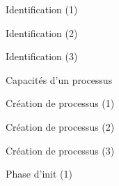 \documentclass[12pt,t]{beamer}
\begin{document}
\begin{frame}{Identification (1)}
\end{frame}

\begin{frame}{Identification (2)}
\end{frame}

\begin{frame}{Identification (3)}
\end{frame}

\begin{frame}{Capacités d'un processus}
\end{frame}

\begin{frame}{Création de processus (1)}
\end{frame}

\begin{frame}{Création de processus (2)}
\end{frame}

\begin{frame}{Création de processus (3)}
\end{frame}

\begin{frame}{Phase d'init (1)}
\end{frame}
\end{document}
